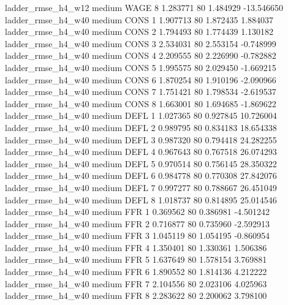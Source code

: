  ladder_rmse_h4_w12     medium     WAGE                 8  1.283771 80       1.484929         -13.546650
 ladder_rmse_h4_w40     medium     CONS                 1  1.907713 80       1.872435           1.884037
 ladder_rmse_h4_w40     medium     CONS                 2  1.794493 80       1.774439           1.130182
 ladder_rmse_h4_w40     medium     CONS                 3  2.534031 80       2.553154          -0.748999
 ladder_rmse_h4_w40     medium     CONS                 4  2.209555 80       2.226990          -0.782882
 ladder_rmse_h4_w40     medium     CONS                 5  1.995575 80       2.029450          -1.669215
 ladder_rmse_h4_w40     medium     CONS                 6  1.870254 80       1.910196          -2.090966
 ladder_rmse_h4_w40     medium     CONS                 7  1.751421 80       1.798534          -2.619537
 ladder_rmse_h4_w40     medium     CONS                 8  1.663001 80       1.694685          -1.869622
 ladder_rmse_h4_w40     medium     DEFL                 1  1.027365 80       0.927845          10.726004
 ladder_rmse_h4_w40     medium     DEFL                 2  0.989795 80       0.834183          18.654338
 ladder_rmse_h4_w40     medium     DEFL                 3  0.987320 80       0.794418          24.282255
 ladder_rmse_h4_w40     medium     DEFL                 4  0.967643 80       0.767518          26.074293
 ladder_rmse_h4_w40     medium     DEFL                 5  0.970514 80       0.756145          28.350322
 ladder_rmse_h4_w40     medium     DEFL                 6  0.984778 80       0.770308          27.842076
 ladder_rmse_h4_w40     medium     DEFL                 7  0.997277 80       0.788667          26.451049
 ladder_rmse_h4_w40     medium     DEFL                 8  1.018737 80       0.814895          25.014546
 ladder_rmse_h4_w40     medium      FFR                 1  0.369562 80       0.386981          -4.501242
 ladder_rmse_h4_w40     medium      FFR                 2  0.716877 80       0.735960          -2.592913
 ladder_rmse_h4_w40     medium      FFR                 3  1.045119 80       1.054195          -0.860954
 ladder_rmse_h4_w40     medium      FFR                 4  1.350401 80       1.330361           1.506386
 ladder_rmse_h4_w40     medium      FFR                 5  1.637649 80       1.578154           3.769881
 ladder_rmse_h4_w40     medium      FFR                 6  1.890552 80       1.814136           4.212222
 ladder_rmse_h4_w40     medium      FFR                 7  2.104556 80       2.023106           4.025963
 ladder_rmse_h4_w40     medium      FFR                 8  2.283622 80       2.200062           3.798100
